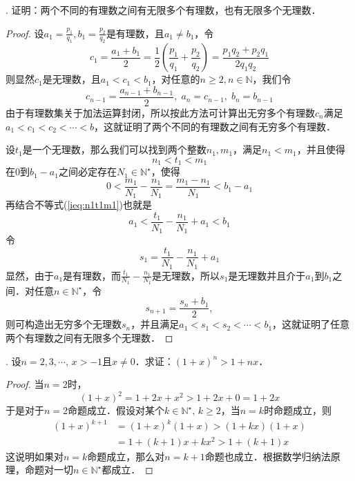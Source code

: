 \documentclass{ctexart}
\theoremstyle{definition}
\theoremstyle{definition}
\theoremstyle{plain}
\theoremstyle{plain}
\theoremstyle{plain}
\theoremstyle{definition}
\begin{document}
. 证明：两个不同的有理数之间有无限多个有理数，也有无限多个无理数．
\begin{proof}
设$\displaystyle a_1 = \frac{p_1}{q_1}, b_1 = \frac{p_2}{q_2}$是有理数，且$a_1 \neq b_1$，令
\begin{equation}
    c_1 = \frac{a_1+b_1}{2} = \frac{1}{2} \left( \frac{p_1}{q_1} + \frac{p_2}{q_2} \right) = \frac{p_1 q_2 + p_2 q_1}{2 q_1 q_2}
\end{equation}
则显然$c_1$是无理数，且$a_1 < c_1 < b_1$，对任意的$n\geq 2, n \in \mathbb{N}$，我们令
\begin{equation}
    c_{n-1} = \frac{a_{n-1}+b_{n-1}}{2}, \; a_n = c_{n-1}, \; b_n = b_{n-1}
\end{equation}
由于有理数集关于加法运算封闭，所以按此方法可计算出无穷多个有理数$c_n$满足$a_1 < c_1 < c_2 < \cdots < b$，这就证明了两个不同的有理数之间有无穷多个有理数．

\noindent 设$t_1$是一个无理数，那么我们可以找到两个整数$n_1, m_1$，满足$n_1 < m_1$，并且使得
\begin{equation}
    n_1 < t_1 < m_1
    \label{ieq:n1t1m1}
\end{equation}
在$0$到$b_1 - a_1$之间必定存在$N_1 \in \mathbb{N}^\star$，使得
\begin{equation}
    0 < \frac{m_1}{N_1} - \frac{n_1}{N_1} = \frac{m_1-n_1}{N_1} < b_1 - a_1
\end{equation}
再结合不等式(\ref{ieq:n1t1m1})也就是
\begin{equation}
    a_1 < \frac{t_1}{N_1} - \frac{n_1}{N_1} + a_1 < b_1
\end{equation}
令
\begin{equation}
    s_1 = \frac{t_1}{N_1} - \frac{n_1}{N_1} + a_1
\end{equation}
显然，由于$a_1$是有理数，而$\displaystyle \frac{t_1}{N_1} - \frac{n_1}{N_1}$是无理数，所以$s_1$是无理数并且介于$a_1$到$b_1$之间．对任意$n \in \mathbb{N}^\star$，令
\begin{equation}
    s_{n+1} = \frac{s_n+b_1}{2}, 
\end{equation}
则可构造出无穷多个无理数$s_{n}$，并且满足$a_1 < s_1 < s_2 < \cdots < b_1$，这就证明了任意两个有理数之间有无限多个无理数．
\end{proof}

. 设$n=2,3,\cdots, \, x > -1$且$x\neq 0$．求证：$(1+x)^n > 1+nx$．
\begin{proof}
当$n=2$时，
\begin{equation}
    (1+x)^2 = 1 + 2x + x^2 > 1 + 2x + 0 = 1 + 2x
\end{equation}
于是对于$n=2$命题成立．假设对某个$k \in \mathbb{N}^\star, \, k \geq 2$，当$n=k$时命题成立，则
\begin{align}
    (1+x)^{k+1} &= (1+x)^k (1+x) > (1+kx)(1+x) \\
    &= 1 + (k+1)x + kx^2 > 1+(k+1)x
\end{align}
这说明如果对$n=k$命题成立，那么对$n=k+1$命题也成立．根据数学归纳法原理，命题对一切$n\in\mathbb{N}^\star$都成立．
\end{proof}
\end{document}
